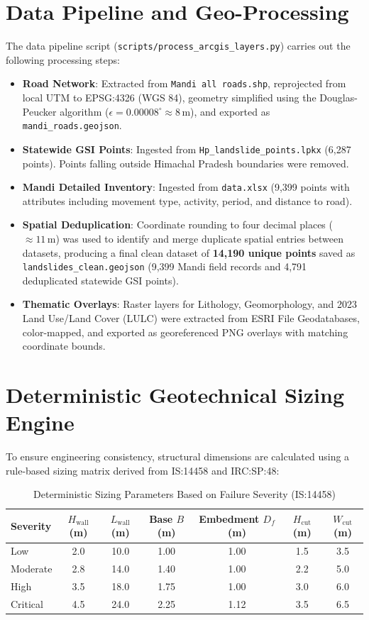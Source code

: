 \documentclass[12pt,a4paper]{report}
\begin{document}
\section{Data Pipeline and Geo-Processing}
The data pipeline script (\texttt{scripts/process\_arcgis\_layers.py}) carries out the following processing steps:
\begin{itemize}
    \item \textbf{Road Network}: Extracted from \texttt{Mandi all roads.shp}, reprojected from local UTM to EPSG:4326 (WGS 84), geometry simplified using the Douglas-Peucker algorithm ($\epsilon = 0.00008^{\circ} \approx 8\,\text{m}$), and exported as \texttt{mandi\_roads.geojson}.
    \item \textbf{Statewide GSI Points}: Ingested from \texttt{Hp\_landslide\_points.lpkx} (6,287 points). Points falling outside Himachal Pradesh boundaries were removed.
    \item \textbf{Mandi Detailed Inventory}: Ingested from \texttt{data.xlsx} (9,399 points with attributes including movement type, activity, period, and distance to road).
    \item \textbf{Spatial Deduplication}: Coordinate rounding to four decimal places ($\approx 11\,\text{m}$) was used to identify and merge duplicate spatial entries between datasets, producing a final clean dataset of \textbf{14,190 unique points} saved as \texttt{landslides\_clean.geojson} (9,399 Mandi field records and 4,791 deduplicated statewide GSI points).
    \item \textbf{Thematic Overlays}: Raster layers for Lithology, Geomorphology, and 2023 Land Use/Land Cover (LULC) were extracted from ESRI File Geodatabases, color-mapped, and exported as georeferenced PNG overlays with matching coordinate bounds.
\end{itemize}

\section{Deterministic Geotechnical Sizing Engine}
To ensure engineering consistency, structural dimensions are calculated using a rule-based sizing matrix derived from IS:14458 and IRC:SP:48:

\begin{table}[h!]
\centering
\caption{Deterministic Sizing Parameters Based on Failure Severity (IS:14458)}
\label{tab:sizing_matrix}
\vspace{0.2cm}
\small
\begin{tabular}{lcccccc}
\toprule
\textbf{Severity} & $H_{\text{wall}}$ (m) & $L_{\text{wall}}$ (m) & Base $B$ (m) & Embedment $D_f$ (m) & $H_{\text{cut}}$ (m) & $W_{\text{cut}}$ (m) \\
\midrule
Low & 2.0 & 10.0 & 1.00 & 1.00 & 1.5 & 3.5 \\
Moderate & 2.8 & 14.0 & 1.40 & 1.00 & 2.2 & 5.0 \\
High & 3.5 & 18.0 & 1.75 & 1.00 & 3.0 & 6.0 \\
Critical & 4.5 & 24.0 & 2.25 & 1.12 & 3.5 & 6.5 \\
\bottomrule
\end{tabular}
\end{table}
\end{document}
